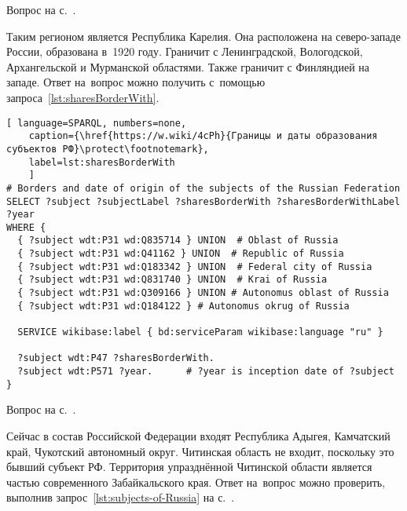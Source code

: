 \begin{task}
\label{answer:subjects_of_Russia_1}
    \AnswerBackref Вопрос на с.~\pageref{lst:sharesBorderWith-oblast-of-Russia}.

    Таким регионом является Республика Карелия. 
    Она расположена на северо-западе России, образована в~1920 году. 
    Граничит с Ленинградской, Вологодской, Архангельской и Мурманской областями. 
    Также граничит с Финляндией на западе.  
    Ответ на~вопрос можно получить с~помощью запроса~\ref{lst:sharesBorderWith}.


\newpage
\begin{lstlisting}[ language=SPARQL, numbers=none,
	caption={\href{https://w.wiki/4cPh}{Границы и даты образования субъектов РФ}\protect\footnotemark},
	label=lst:sharesBorderWith
	]
# Borders and date of origin of the subjects of the Russian Federation
SELECT ?subject ?subjectLabel ?sharesBorderWith ?sharesBorderWithLabel ?year 
WHERE {
  { ?subject wdt:P31 wd:Q835714 } UNION  # Oblast of Russia
  { ?subject wdt:P31 wd:Q41162 } UNION  # Republic of Russia
  { ?subject wdt:P31 wd:Q183342 } UNION  # Federal city of Russia
  { ?subject wdt:P31 wd:Q831740 } UNION  # Krai of Russia
  { ?subject wdt:P31 wd:Q309166 } UNION # Autonomus oblast of Russia
  { ?subject wdt:P31 wd:Q184122 } # Autonomus okrug of Russia
  
  SERVICE wikibase:label { bd:serviceParam wikibase:language "ru" }
  
  ?subject wdt:P47 ?sharesBorderWith. 
  ?subject wdt:P571 ?year.      # ?year is inception date of ?subject
}
\end{lstlisting}
\end{task}



\begin{task}
	\label{answer:subjects_of_Russia_2}
    \AnswerBackref Вопрос на с.~\pageref{lst:sharesBorderWith-empty-oblast-of-Russia}.

    Сейчас в состав Российской Федерации входят Республика Адыгея, 
    Камчатский край, Чукотский автономный округ.
    Читинская область не входит, поскольку это бывший субъект РФ. 
    Территория упразднённой Читинской области является частью современного Забайкальского края. 
    Ответ на~вопрос можно проверить, 
    выполнив запрос~\ref{lst:subjects-of-Russia} на с.~\pageref{lst:subjects-of-Russia}.
\end{task}



